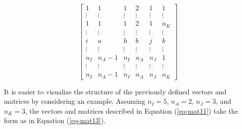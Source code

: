 \documentclass[
  authoryear,
  review,
  1p]{elsarticle}
\begin{document}
\begin{equation}
{\begin{bmatrix}
1 & 1 & 1 & 2 & 1 & 1 \\
\vdots & \vdots & \vdots & \vdots & \vdots & \vdots\\
1 & 1 & 1 & 2 & 1 & n_{K} \\
\vdots & \vdots & \vdots & \vdots & \vdots & \vdots\\
i & a & h & b & j & k \\
\vdots & \vdots & \vdots & \vdots & \vdots & \vdots\\
n_{I} & n_{A}-1 & n_{I} & n_{A} & n_{J} & 1 \\
\vdots & \vdots & \vdots & \vdots & \vdots & \vdots\\
n_{I} & n_{A}-1 & n_{I} & n_{A} & n_{J} & n_{K}
\end{bmatrix}
}\end{equation}

It is easier to visualize the structure of the previously defined
vectors and matrices by considering an example. Assuming \(n_{I} = 5\),
\(n_{A} = 2\), \(n_{J} = 3\), and \(n_{K} = 3\), the vectors and
matrices described in Equation (\ref{eq-mat11}) take the form as in
Equation (\ref{eq-mat13}).
\end{document}
